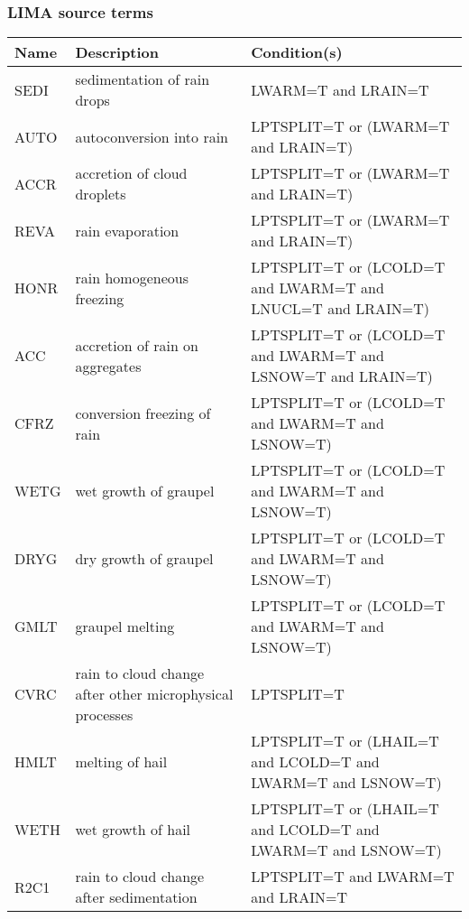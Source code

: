 \subsubsection{LIMA source terms}

\begin{longtable} {|p{}|p{}|p{}|}
\hline
Name & Description & Condition(s) \\
\hline \hline
\endhead
SEDI   & sedimentation of rain drops                              & LWARM=T and LRAIN=T \\\hline
AUTO   & autoconversion into rain                                 & LPTSPLIT=T or (LWARM=T and LRAIN=T) \\\hline
ACCR   & accretion of cloud droplets                              & LPTSPLIT=T or (LWARM=T and LRAIN=T) \\\hline
REVA   & rain evaporation                                         & LPTSPLIT=T or (LWARM=T and LRAIN=T) \\\hline
HONR   & rain homogeneous freezing                                & LPTSPLIT=T or (LCOLD=T and LWARM=T and LNUCL=T and LRAIN=T) \\\hline
ACC    & accretion of rain on aggregates                          & LPTSPLIT=T or (LCOLD=T and LWARM=T and LSNOW=T and LRAIN=T) \\\hline
CFRZ   & conversion freezing of rain                              & LPTSPLIT=T or (LCOLD=T and LWARM=T and LSNOW=T) \\\hline
WETG   & wet growth of graupel                                    & LPTSPLIT=T or (LCOLD=T and LWARM=T and LSNOW=T) \\\hline
DRYG   & dry growth of graupel                                    & LPTSPLIT=T or (LCOLD=T and LWARM=T and LSNOW=T) \\\hline
GMLT   & graupel melting                                          & LPTSPLIT=T or (LCOLD=T and LWARM=T and LSNOW=T) \\\hline
CVRC   & rain to cloud change after other microphysical processes & LPTSPLIT=T \\\hline
HMLT   & melting of hail                                          & LPTSPLIT=T or (LHAIL=T and LCOLD=T and LWARM=T and LSNOW=T) \\\hline
WETH   & wet growth of hail                                       & LPTSPLIT=T or (LHAIL=T and LCOLD=T and LWARM=T and LSNOW=T) \\\hline
R2C1   & rain to cloud change after sedimentation                 & LPTSPLIT=T and LWARM=T and LRAIN=T \\\hline

\end{longtable}
